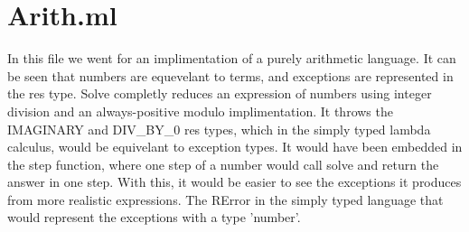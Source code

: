 \documentclass{article}
\begin{document}
\section*{Arith.ml}
In this file we went for an implimentation of a purely arithmetic language. It can be seen that numbers are equevelant to terms, and exceptions are represented in the res type. Solve completly reduces an expression of numbers using integer division and an always-positive modulo implimentation. It throws the IMAGINARY and DIV_BY_0 res types, which in the simply typed lambda calculus, would be equivelant to exception types. It would have been embedded in the step function, where one step of a number would call solve and return the answer in one step. With this, it would be easier to see the exceptions it produces from more realistic expressions. The RError in the simply typed language that would represent the exceptions with a type 'number'.  
\end{document}
